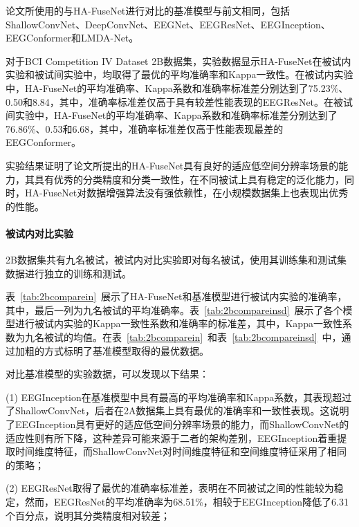 论文所使用的与HA-FuseNet进行对比的基准模型与前文相同，包括ShallowConvNet\cite{schirrmeister2017deep}、DeepConvNet\cite{schirrmeister2017deep}、EEGNet\cite{lawhern2018eegnet}、EEGResNet\cite{HBM:HBM23730}、EEGInception\cite{zhang2021eeg}、EEGConformer\cite{song2022eeg}和LMDA-Net\cite{miao2023lmda}。

对于BCI Competition IV Dataset 2B数据集，实验数据显示HA-FuseNet在被试内实验和被试间实验中，均取得了最优的平均准确率和Kappa一致性。在被试内实验中，HA-FuseNet的平均准确率、Kappa系数和准确率标准差分别达到了75.23\%、0.50和8.84，其中，准确率标准差仅高于具有较差性能表现的EEGResNet。在被试间实验中，HA-FuseNet的平均准确率、Kappa系数和准确率标准差分别达到了76.86\%、0.53和6.68，其中，准确率标准差仅高于性能表现最差的EEGConformer。

实验结果证明了论文所提出的HA-FuseNet具有良好的适应低空间分辨率场景的能力，其具有优秀的分类精度和分类一致性，在不同被试上具有稳定的泛化能力，同时，HA-FuseNet对数据增强算法没有强依赖性，在小规模数据集上也表现出优秀的性能。

\paragraph{被试内对比实验}

2B数据集共有九名被试，被试内对比实验即对每名被试，使用其训练集和测试集数据进行独立的训练和测试。

表~\ref{tab:2bcomparein}~展示了HA-FuseNet和基准模型进行被试内实验的准确率，其中，最后一列为九名被试的平均准确率。表~\ref{tab:2bcompareinsd}~展示了各个模型进行被试内实验的Kappa一致性系数和准确率的标准差，其中，Kappa一致性系数为九名被试的均值。在表~\ref{tab:2bcomparein}~和表~\ref{tab:2bcompareinsd}~中，通过加粗的方式标明了基准模型取得的最优数据。

对比基准模型的实验数据，可以发现以下结果：

(1) EEGInception在基准模型中具有最高的平均准确率和Kappa系数，其表现超过了ShallowConvNet，后者在2A数据集上具有最优的准确率和一致性表现。这说明了EEGInception具有更好的适应低空间分辨率场景的能力，而ShallowConvNet的适应性则有所下降，这种差异可能来源于二者的架构差别，EEGInception着重提取时间维度特征，而ShallowConvNet对时间维度特征和空间维度特征采用了相同的策略；

(2) EEGResNet取得了最优的准确率标准差，表明在不同被试之间的性能较为稳定，然而，EEGResNet的平均准确率为68.51\%，相较于EEGInception降低了6.31个百分点，说明其分类精度相对较差；

